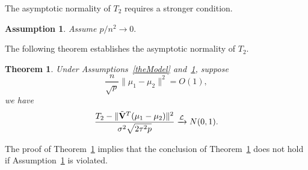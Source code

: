 \documentclass[review]{elsarticle}
\theoremstyle{plain}
\newtheorem{theorem}{\quad\quad Theorem}
\newtheorem{assumption}{\quad\quad Assumption}
\theoremstyle{definition}
\newtheorem{remark}{\quad\quad Remark}
\theoremstyle{remark}
\begin{document}
The asymptotic normality of $T_2$ requires a stronger condition.
\begin{assumption}\label{pAndN}
    Assume
    $
    {p}/{n^2}\to 0.
    $
\end{assumption}
The following theorem establishes the asymptotic normality of $T_2$.
\begin{theorem}\label{myPanpan}
    Under Assumptions~\ref{theModel} and~\ref{pAndN},
suppose
    $$\frac{n}{\sqrt{p}}\|\mu_1-\mu_2\|^2=O(1),$$
    we have
\begin{equation*}
        \frac{T_2-\|\tilde{\mathbf{V}}^T(\mu_1-\mu_2)\|^2}{\sigma^2\sqrt{2\tau^2 p}}\xrightarrow{\mathcal{L}}N(0,1).
\end{equation*}
\end{theorem} 
The proof of Theorem~\ref{myPanpan} implies that the conclusion of Theorem~\ref{myPanpan} does not hold if Assumption~\ref{pAndN} is violated.

\end{document}
